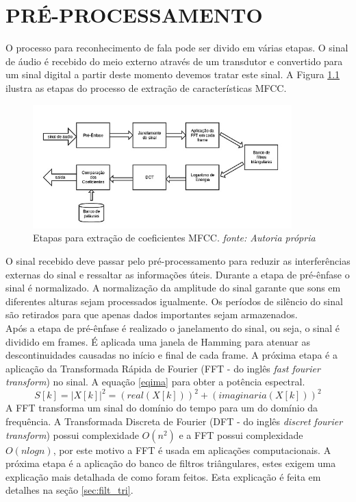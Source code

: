 \chapter{PRÉ-PROCESSAMENTO}
 \thispagestyle{plain}
\label{chap:pre_proc}

\quad O processo para reconhecimento de fala pode ser divido em várias etapas. O sinal de áudio é recebido do meio externo através de um transdutor e convertido para um sinal digital
a partir deste momento devemos tratar este sinal. A  Figura \ref{fig:diaMFCC} ilustra as etapas do processo de extração de características MFCC.

\begin{figure}[H]
\centering %
\includegraphics[width=10cm]{img/diaMFCC.jpg} %
\caption{Etapas para extração de coeficientes MFCC. \textit{fonte: Autoria própria}}
\label{fig:diaMFCC}
\end{figure}

O sinal recebido deve passar pelo pré-processamento para reduzir as interferências externas do sinal e ressaltar as informações úteis. Durante a etapa de pré-ênfase o sinal é normalizado. A normalização da amplitude do sinal garante que sons em diferentes alturas sejam processados igualmente. Os períodos de silêncio do sinal são retirados para que apenas dados importantes sejam armazenados.\\ Após a etapa de pré-ênfase é realizado o janelamento do sinal, ou seja, o sinal é dividido em frames. É aplicada uma janela de Hamming para atenuar as descontinuidades causadas no início e final de cada frame.  A próxima etapa é a aplicação da Transformada Rápida de Fourier (FFT - do inglês \textit{fast fourier transform}) no sinal. A equação \ref{eqima} para obter a potência espectral.
\begin{equation}
\label{eqima}
S[k] = |X[k]|^2 = (real(X[k]))^2 +  (imaginaria(X[k]))^2
\end{equation}
 A FFT transforma um sinal do domínio do tempo para um do domínio da frequência.  A  Transformada Discreta de Fourier (DFT - do inglês \textit{discret fourier transform}) possui complexidade $O(n^2)$ e a FFT possui complexidade $O(n log n)$, por este motivo a FFT é usada em aplicações computacionais. A próxima etapa é a aplicação do banco de filtros triângulares, estes exigem uma explicação mais detalhada de como foram feitos. Esta explicação é feita em detalhes na seção \ref{sec:filt_tri}.


